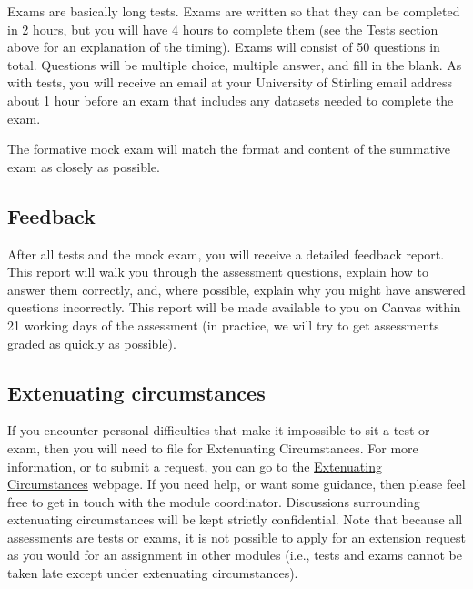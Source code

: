 \documentclass[
]{scrbook}
\begin{document}
Exams are basically long tests.
Exams are written so that they can be completed in 2 hours, but you will have 4 hours to complete them (see the \protect\hyperlink{tests}{Tests} section above for an explanation of the timing).
Exams will consist of 50 questions in total.
Questions will be multiple choice, multiple answer, and fill in the blank.
As with tests, you will receive an email at your University of Stirling email address about 1 hour before an exam that includes any datasets needed to complete the exam.

The formative mock exam will match the format and content of the summative exam as closely as possible.

\hypertarget{feedback}{%
\subsection*{Feedback}\label{feedback}}

After all tests and the mock exam, you will receive a detailed feedback report.
This report will walk you through the assessment questions, explain how to answer them correctly, and, where possible, explain why you might have answered questions incorrectly.
This report will be made available to you on Canvas within 21 working days of the assessment (in practice, we will try to get assessments graded as quickly as possible).

\hypertarget{extenuating_circumstances}{%
\subsection*{Extenuating circumstances}\label{extenuating_circumstances}}

If you encounter personal difficulties that make it impossible to sit a test or exam, then you will need to file for Extenuating Circumstances.
For more information, or to submit a request, you can go to the \href{https://www.stir.ac.uk/about/professional-services/student-academic-and-corporate-services/academic-registry/student-information/exams/extenuating-circumstances/}{Extenuating Circumstances} webpage.
If you need help, or want some guidance, then please feel free to get in touch with the module coordinator.
Discussions surrounding extenuating circumstances will be kept strictly confidential.
Note that because all assessments are tests or exams, it is not possible to apply for an extension request as you would for an assignment in other modules (i.e., tests and exams cannot be taken late except under extenuating circumstances).
\end{document}
